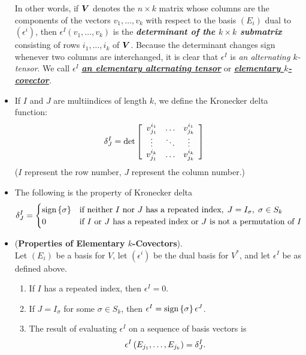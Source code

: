 \documentclass[11pt]{article}
\begin{document}
\begin{itemize}
\begin{definition}
In other words, if $\boldsymbol{V}$ denotes the $n \times k$ matrix whose columns are the components of the vectors $v_1,\ldots,v_k$ with respect to the basis $(E_i)$ dual to $(\epsilon^i)$, then $\epsilon^I(v_1, \ldots, v_k)$ is the \emph{\textbf{determinant of the $k\times k$ submatrix}} consisting of rows $i_1,\ldots, i_k$ of $\boldsymbol{V}$. Because the determinant changes sign whenever two columns are interchanged, it is clear that $\epsilon^I$ is \emph{an alternating $k$-tensor}. We call $\epsilon^I$ \underline{\emph{\textbf{an elementary alternating tensor}}} or \underline{\emph{\textbf{elementary $k$-covector}}}.
\end{definition}

\item \begin{definition}
If $I$ and $J$ are multiindices of length $k$, we define the Kronecker delta function:
\begin{align*}
\delta_{J}^{I} &= \det{\left[ \begin{array}{ccc}
v_{j_1}^{i_1} & \ldots & v_{j_k}^{i_1}\\
\vdots & \ddots & \vdots \\
v_{j_1}^{i_k} & \ldots & v_{j_k}^{i_k}
\end{array}  \right]}
\end{align*} ($I$ represent the row number, $J$ represent the column number.)
\end{definition}

\item \begin{remark} The following is the property of Kronecker delta
\begin{equation*}
  \delta_{J}^{I} =
    \begin{cases}
      \text{sign}\left\{\sigma\right\} &\text{if neither $I$ nor $J$ has a repeated index},\; J = I_{\sigma}, \; \sigma \in S_k\\
      0 & \text{if $I$ or $J$ has a repeated index or $J$ is not a permutation of $I$}
    \end{cases}       
\end{equation*}
\end{remark}

\item \begin{lemma} (\textbf{Properties of Elementary $k$-Covectors}). \\
Let $(E_i)$ be a basis for $V$, let $(\epsilon^i)$ be the dual basis for $V^{*}$, and let $\epsilon^I$ be as defined above.
\begin{enumerate}
\item If $I$ has a repeated index, then $\epsilon^I = 0$.
\item If $J = I_{\sigma}$ for some $\sigma \in S_k$, then $\epsilon^I = \text{sign}\left\{\sigma\right\}\epsilon^{J}$.
\item The result of evaluating $\epsilon^I$ on a sequence of basis vectors is
\begin{align*}
\epsilon^I\left(E_{j_1},\ldots, E_{j_{k}}\right) = \delta_{J}^{I}.
\end{align*}
\end{enumerate}
\end{lemma}


\end{itemize}
\end{document}
